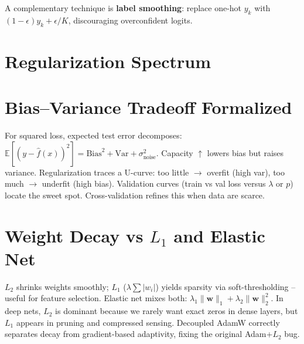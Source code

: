 A complementary technique is \textbf{label smoothing}: replace one-hot $y_k$ with $(1-\epsilon)y_k+\epsilon/K$, discouraging overconfident logits.

\section{Regularization Spectrum}
\begin{center}
\end{center}

\section{Bias--Variance Tradeoff Formalized}
For squared loss, expected test error decomposes:
$\mathbb{E}[(y-\hat f(x))^2]=\text{Bias}^2+\text{Var}+\sigma^2_{\text{noise}}$.
Capacity $\uparrow$ lowers bias but raises variance. Regularization traces a
U-curve: too little $\to$ overfit (high var), too much $\to$ underfit (high
bias). Validation curves (train vs val loss versus $\lambda$ or $p$) locate the
sweet spot. Cross-validation refines this when data are scarce.

\section{Weight Decay vs \texorpdfstring{$L_1$}{L1} and Elastic Net}
$L_2$ shrinks weights smoothly; $L_1$ ($\lambda\sum|w_i|$) yields sparsity via
soft-thresholding -- useful for feature selection. Elastic net mixes both:
$\lambda_1\|\mathbf{w}\|_1+\lambda_2\|\mathbf{w}\|_2^2$. In deep nets, $L_2$ is
dominant because we rarely want exact zeros in dense layers, but $L_1$ appears
in pruning and compressed sensing. Decoupled AdamW correctly separates decay
from gradient-based adaptivity, fixing the original Adam+$L_2$ bug.

